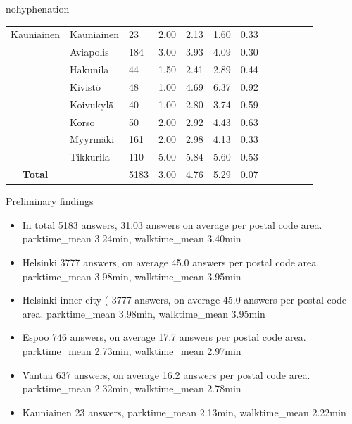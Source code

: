 \begin{hyphenrules}{nohyphenation}
\begin{table}[H]
{\begin{tabular}{clLcccCccccc}
            Kauniainen & Kauniainen & 23 & 2.00 & 2.13 & 1.60 & 0.33 & \\
            \greyrule
             & Aviapolis & 184 & 3.00 & 3.93 & 4.09 & 0.30 & \\
            & Hakunila & 44 & 1.50 & 2.41 & 2.89 & 0.44 & \\
            & Kivistö & 48 & 1.00 & 4.69 & 6.37 & 0.92 & \\
            & Koivukylä & 40 & 1.00 & 2.80 & 3.74 & 0.59 & \\
            & Korso & 50 & 2.00 & 2.92 & 4.43 & 0.63 & \\
            & Myyrmäki & 161 & 2.00 & 2.98 & 4.13 & 0.33 & \\
            & Tikkurila & 110 & 5.00 & 5.84 & 5.60 & 0.53 & \\
            \greyrule
            \textbf{Total} & & 5183 & 3.00 & 4.76 & 5.29 & 0.07 & \\
            \bottomrule
        \end{tabular}}
    \end{table}
\end{hyphenrules}

Preliminary findings
\begin{itemize}
    \item In total 5183 answers, 31.03 answers on average per postal code area. parktime\_mean 3.24min, walktime\_mean 3.40min
    \item Helsinki 3777 answers, on average 45.0 answers per postal code area. parktime\_mean 3.98min, walktime\_mean 3.95min
    \item Helsinki inner city ( 3777 answers, on average 45.0 answers per postal code area. parktime\_mean 3.98min, walktime\_mean 3.95min
    \item Espoo 746 answers, on average 17.7 answers per postal code area. parktime\_mean 2.73min, walktime\_mean 2.97min
    \item Vantaa 637 answers, on average 16.2 answers per postal code area. parktime\_mean 2.32min, walktime\_mean 2.78min
    \item Kauniainen 23 answers, parktime\_mean 2.13min, walktime\_mean 2.22min
\end{itemize}


